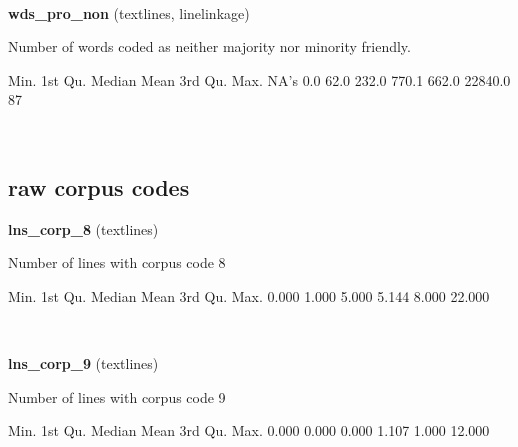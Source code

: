 \documentclass[]{article}
\newenvironment{Shaded}{\begin{snugshade}}{\end{snugshade}}
\newcommand{\FloatTok}[1]{\textcolor[rgb]{0.00,0.00,0.81}{{#1}}}
\newcommand{\StringTok}[1]{\textcolor[rgb]{0.31,0.60,0.02}{{#1}}}
\newcommand{\NormalTok}[1]{{#1}}
\begin{document}
~

\vspace{1em}

\textbf{wds\_pro\_non} (textlines, linelinkage)

Number of words coded as neither majority nor minority friendly.

\begin{Shaded}
\begin{Highlighting}[]
   \NormalTok{Min. 1st Qu.  Median    Mean 3rd Qu.    Max.    NA}\StringTok{'s }
\StringTok{    0.0    62.0   232.0   770.1   662.0 22840.0      87 }
\end{Highlighting}
\end{Shaded}

~

\vspace{1em}

\subsection{raw corpus codes}\label{raw-corpus-codes}

\textbf{lns\_corp\_8} (textlines)

Number of lines with corpus code 8

\begin{Shaded}
\begin{Highlighting}[]
   \NormalTok{Min. 1st Qu.  Median    Mean 3rd Qu.    Max. }
  \FloatTok{0.000}   \FloatTok{1.000}   \FloatTok{5.000}   \FloatTok{5.144}   \FloatTok{8.000}  \FloatTok{22.000} 
\end{Highlighting}
\end{Shaded}

~

\vspace{1em}

\textbf{lns\_corp\_9} (textlines)

Number of lines with corpus code 9

\begin{Shaded}
\begin{Highlighting}[]
   \NormalTok{Min. 1st Qu.  Median    Mean 3rd Qu.    Max. }
  \FloatTok{0.000}   \FloatTok{0.000}   \FloatTok{0.000}   \FloatTok{1.107}   \FloatTok{1.000}  \FloatTok{12.000} 
\end{Highlighting}
\end{Shaded}

~

\vspace{1em}
\end{document}
